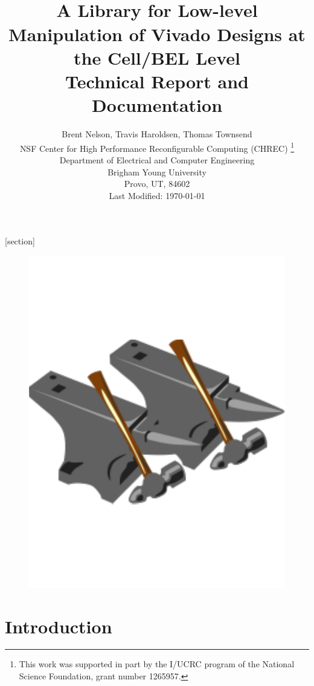 \documentclass[12pt]{article}
\begin{document}
[section]

\date{}
\title{{\bf \Huge {}}\\[0.1in]
A Library for Low-level Manipulation 
of Vivado Designs at the Cell/BEL Level\\[0.3in]
Technical Report and Documentation\\[0.1in]
}
\author{\Large Brent Nelson, Travis Haroldsen, Thomas Townsend\\[0.2in] \large NSF Center for High Performance Reconfigurable Computing (CHREC)
\thanks{This work was supported in part by the I/UCRC program of the National
 Science Foundation, grant number 1265957.}\\
\large Department of Electrical and Computer Engineering  \\
\large  Brigham Young University \\
\large  Provo, UT, 84602 \\[0.7in]
\large Last Modified: \today \\[0.05in]
}


\maketitle
\begin{figure}[H]
\centering
\includegraphics[width=0.4\columnwidth]{logo}
\end{figure}
\newpage
\tableofcontents


% 

\newpage
\section{Introduction}
\end{document}
